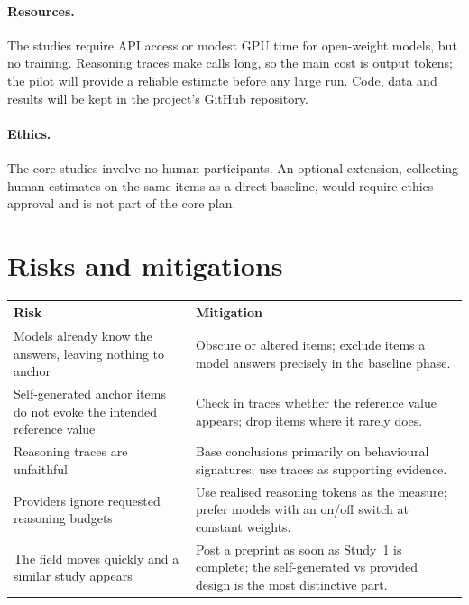 \documentclass[11pt,a4paper]{article}
\begin{document}
\paragraph{Resources.} The studies require API access or modest GPU time for open-weight models, but no training. Reasoning traces make calls long, so the main cost is output tokens; the pilot will provide a reliable estimate before any large run. Code, data and results will be kept in the project's GitHub repository.

\paragraph{Ethics.} The core studies involve no human participants. An optional extension, collecting human estimates on the same items as a direct baseline, would require ethics approval and is not part of the core plan.

\section{Risks and mitigations}

\begin{table}[h]
\centering
\small
\begin{tabularx}{\textwidth}{@{}p{4.2cm}L@{}}
\toprule
\textbf{Risk} & \textbf{Mitigation} \\
\midrule
Models already know the answers, leaving nothing to anchor & Obscure or altered items; exclude items a model answers precisely in the baseline phase. \\
\addlinespace
Self-generated anchor items do not evoke the intended reference value & Check in traces whether the reference value appears; drop items where it rarely does. \\
\addlinespace
Reasoning traces are unfaithful & Base conclusions primarily on behavioural signatures; use traces as supporting evidence. \\
\addlinespace
Providers ignore requested reasoning budgets & Use realised reasoning tokens as the measure; prefer models with an on/off switch at constant weights. \\
\addlinespace
The field moves quickly and a similar study appears & Post a preprint as soon as Study~1 is complete; the self-generated vs provided design is the most distinctive part. \\
\bottomrule
\end{tabularx}
\end{table}
\end{document}
